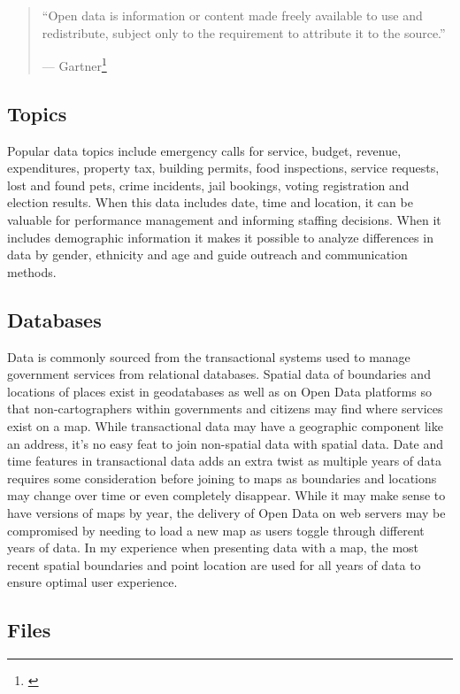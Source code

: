 \documentclass[
  openany]{book}
\begin{document}
\begin{quote}
``Open data is information or content made freely available to use and redistribute, subject only to the requirement to attribute it to the source.''

--- Gartner\footnote{\citet{gartner_opendata}}
\end{quote}

\hypertarget{topics}{%
\subsection{Topics}\label{topics}}

Popular data topics include emergency calls for service, budget, revenue, expenditures, property tax, building permits, food inspections, service requests, lost and found pets, crime incidents, jail bookings, voting registration and election results. When this data includes date, time and location, it can be valuable for performance management and informing staffing decisions. When it includes demographic information it makes it possible to analyze differences in data by gender, ethnicity and age and guide outreach and communication methods.

\hypertarget{databases}{%
\subsection{Databases}\label{databases}}

Data is commonly sourced from the transactional systems used to manage government services from relational databases.
Spatial data of boundaries and locations of places exist in geodatabases as well as on Open Data platforms so that non-cartographers within governments and citizens may find where services exist on a map. While transactional data may have a geographic component like an address, it's no easy feat to join non-spatial data with spatial data. Date and time features in transactional data adds an extra twist as multiple years of data requires some consideration before joining to maps as boundaries and locations may change over time or even completely disappear. While it may make sense to have versions of maps by year, the delivery of Open Data on web servers may be compromised by needing to load a new map as users toggle through different years of data. In my experience when presenting data with a map, the most recent spatial boundaries and point location are used for all years of data to ensure optimal user experience.

\hypertarget{files}{%
\subsection{Files}\label{files}}
\end{document}
